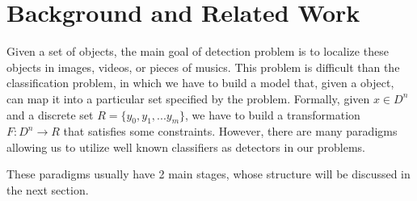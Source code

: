 \documentclass[conference]{IEEEtran}
\begin{document}

\section{Background and Related Work}
Given a set of objects, the main goal of detection problem is to localize these objects in images, videos, or pieces of musics. This problem is difficult than the classification problem, in which we have to build a model that, given a object, can map it into a particular set specified by the problem. Formally, given $x \in D^n$ and a discrete set $R = \{y_0, y_1, ... y_m\}$, we have to build a transformation $F: D^n \rightarrow R$ that satisfies some constraints. However, there are many paradigms allowing us to utilize well known classifiers as detectors in our problems.

These paradigms usually have 2 main stages, whose structure will be discussed in the next section. 
\end{document}
